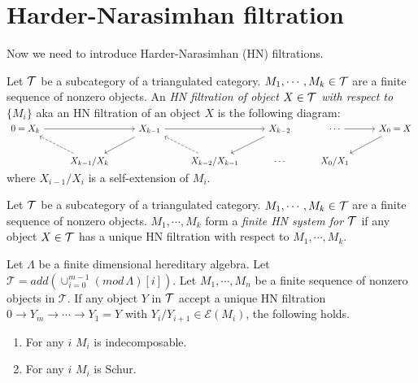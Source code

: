 \section{Harder-Narasimhan filtration}
\indent Now we need to introduce Harder-Narasimhan (HN) filtrations.\\
\begin{definition}
Let $\mathcal{T}$ be a subcategory of a triangulated category. $M_1,\cdots, M_k\in \mathcal{T}$ are a finite sequence of nonzero objects.  An \textit{HN filtration of object $X\in\mathcal{T}$ with respect to $\{M_i\}$} aka an HN filtration of an object $X$ is the following diagram:\\
$\begin{tikzcd}
0 = X_k\arrow[rr] &                               & X_{k-1}\arrow[ld]\arrow[rr]&                & X_{k-2}\arrow[ld]& \cdots & X_0 = X\arrow[ld]\arrow[l,leftarrow]\\
                            & X_{k-1}/X_k\arrow[lu, dashrightarrow] &        & X_{k-2}/X_{k-1}\arrow[lu, dashrightarrow] & \cdots & X_0/X_1&
\end{tikzcd}$
where $X_{i-1}/X_i$ is a self-extension of $M_i$. 
\end{definition}
\begin{definition}
Let $\mathcal{T}$ be a subcategory of a triangulated category. $M_1,\cdots, M_k\in \mathcal{T}$ are a finite sequence of nonzero objects. $M_1,\cdots, M_k$ form a \textit{finite HN system for $\mathcal{T}$} if any object $X\in\mathcal{T}$ has a unique HN filtration with respect to $M_1,\cdots, M_k$.
\end{definition}
\begin{lemma}\label{lem:C3L3}
Let $\Lambda$ be a finite dimensional hereditary algebra. Let $\mathcal{T} = add(\cup_{i=0}^{m-1} (mod\,\Lambda)[i])$. Let $M_1,\cdots, M_n$ be a finite sequence of nonzero objects in $\mathcal{T}$. If any object $Y$ in $\mathcal{T}$ accept a unique HN filtration $0\to Y_m\to\cdots\to Y_1=Y$ with $Y_i/Y_{i+1}\in \mathcal{E}(M_i)$, the following holds.
\begin{enumerate}
\item For any $i$ $M_i$ is indecomposable.
\item For any $i$ $M_i$ is Schur.
\end{enumerate}
\end{lemma}
